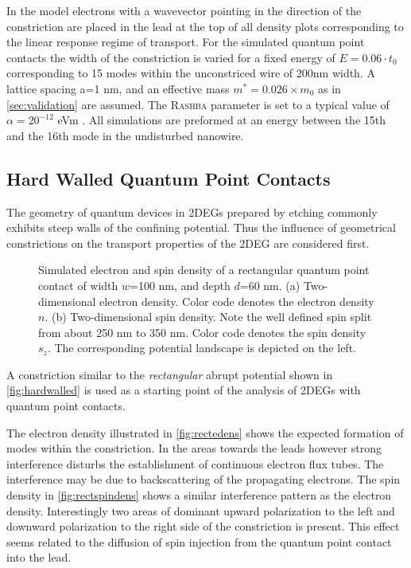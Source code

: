 In the model electrons with a wavevector pointing in the direction of the constriction are placed in the lead at the top of all density plots corresponding to the linear response regime of transport.
For the simulated quantum point contacts the width of the constriction is varied for a fixed energy of $E=0.06\cdot t_0$ corresponding to 15 modes within the unconstriced wire of 200nm width. A lattice spacing a=1 nm, and an effective mass  $m^*=0.026 \times m_0$ as in \cref{sec:validation} are assumed. The \textsc{Rashba} parameter is set to a typical value of $\alpha = 20^{-12}$ eVm \cite{Jacob2009Thesis}. All simulations are preformed at an energy between the 15th and the 16th mode in the undisturbed nanowire.
\subsection{Hard Walled Quantum Point Contacts}
The geometry of quantum devices in 2DEGs prepared by etching commonly exhibits steep walls of the confining potential. Thus the influence of geometrical constrictions on the transport properties of the 2DEG are considered first.
\begin{figure}[h]
\caption{Simulated electron and spin density of a rectangular quantum point contact of  width $w$=100 nm, and depth $d$=60 nm. (a) Two-dimensional electron density. Color code denotes the electron density $n$. (b) Two-dimensional spin density. Note the well defined spin split from about 250 nm to 350 nm. Color code denotes the spin density $s_z$. The corresponding potential landscape is depicted on the left.}
\end{figure}
A constriction similar to the \emph{rectangular} abrupt potential shown in \cref{fig:hardwalled} is used as a starting point of the analysis of 2DEGs with quantum point contacts.\par
The electron density illustrated in \cref{fig:rectedens} shows the expected formation of modes within the constriction. In the areas towards the leads however strong interference disturbs the establishment of continuous electron flux tubes. The interference may be due to backscattering of the propagating electrons. The spin density in \cref{fig:rectspindens} shows a similar interference pattern as the electron density. Interestingly two areas of dominant upward polarization to the left and downward polarization to the right side of the constriction is present. This effect seems related to the diffusion of spin injection from the quantum point contact into the lead.\par
